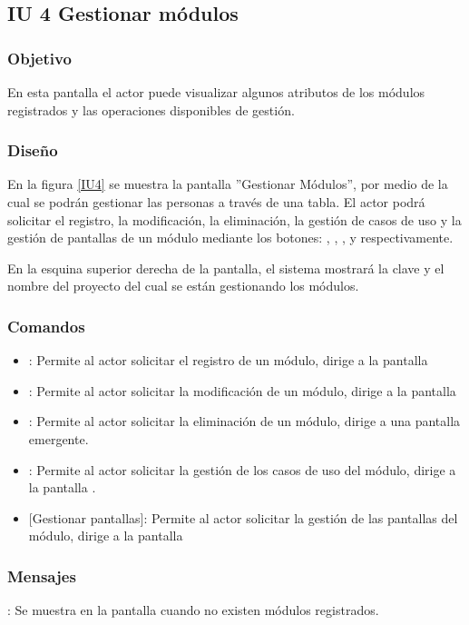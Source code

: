 \subsection{IU 4 Gestionar módulos}

\subsubsection{Objetivo}
	En esta pantalla el actor puede visualizar algunos atributos de los módulos registrados y las operaciones disponibles de gestión.
\subsubsection{Diseño}
	En la figura \ref{IU4} se muestra la pantalla ''Gestionar Módulos'', por medio de la cual se podrán gestionar las personas a través de una tabla. El actor podrá solicitar el registro, la modificación, la eliminación, la gestión de casos de uso y la gestión de pantallas de un módulo mediante los botones: , \editar, \eliminar, {\UCsist } y  respectivamente.
	
	En la esquina superior derecha de la pantalla, el sistema mostrará la clave y el nombre del proyecto del cual se están gestionando los módulos.

\label{IU4}
\subsubsection{Comandos}
\begin{itemize}
	\item {}: Permite al actor solicitar el registro de un módulo, dirige a la pantalla 
	\item \editar [Modificar]: Permite al actor solicitar la modificación de un módulo, dirige a la pantalla 
	\item \eliminar [Eliminar]: Permite al actor solicitar la eliminación de un módulo, dirige a una pantalla emergente.
	\item {}: Permite al actor solicitar la gestión de los casos de uso del módulo, dirige a la pantalla .
	\item {} [Gestionar pantallas]: Permite al actor solicitar la gestión de las pantallas del módulo, dirige a la pantalla 
\end{itemize}

\subsubsection{Mensajes}

\begin{Citemize}
	\item {}: Se muestra en la pantalla  cuando no existen módulos registrados.
\end{Citemize}
